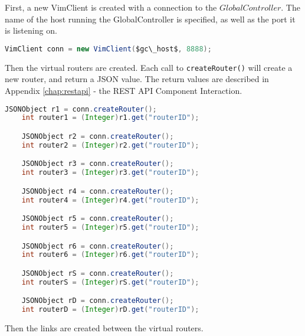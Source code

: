 \noindent First, a new VimClient is created with a connection to the
$GlobalController$.  The name of the host running the GlobalController
is specified, as well as the port it is listening on.

\begin{lstlisting}[language=Java,frame=single]
    VimClient conn = new VimClient($gc\_host$, 8888);

\end{lstlisting}

\noindent Then the virtual routers are created.  Each call to
\texttt{createRouter()} will create a new router, and return a JSON
value.  The return values are described in Appendix \ref{chap:restapi}
- the REST API Component Interaction.

\begin{lstlisting}[language=Java,frame=single]
    JSONObject r1 = conn.createRouter();
    int router1 = (Integer)r1.get("routerID");

    JSONObject r2 = conn.createRouter();
    int router2 = (Integer)r2.get("routerID");

    JSONObject r3 = conn.createRouter();
    int router3 = (Integer)r3.get("routerID");

    JSONObject r4 = conn.createRouter();
    int router4 = (Integer)r4.get("routerID");

    JSONObject r5 = conn.createRouter();
    int router5 = (Integer)r5.get("routerID");

    JSONObject r6 = conn.createRouter();
    int router6 = (Integer)r6.get("routerID");

    JSONObject rS = conn.createRouter();
    int routerS = (Integer)rS.get("routerID");

    JSONObject rD = conn.createRouter();
    int routerD = (Integer)rD.get("routerID");

\end{lstlisting}

\noindent Then the links are created between the virtual routers.

